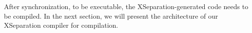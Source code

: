 
After synchronization, to be executable, the XSeparation-generated code needs to be compiled.
In the next section, we will present the architecture of our XSeparation compiler for compilation. 

%

%
%
